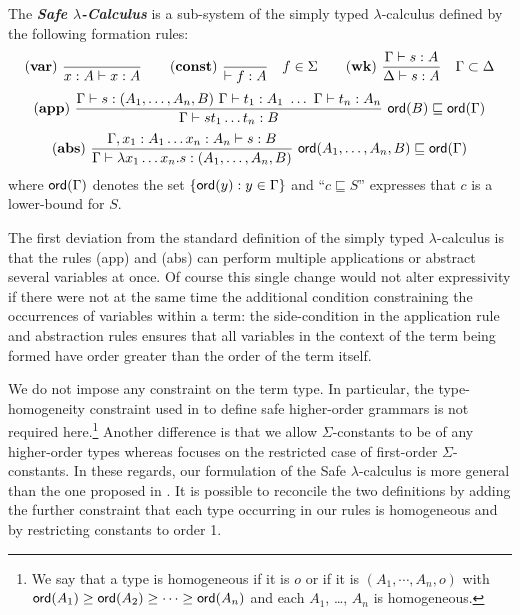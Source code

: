 \documentclass{llncs}
\newcommand\defname[1]{{\bf\em #1}\index{#1}}
\newcommand\dps{\displaystyle}
\newcommand\rulef[2]{\frac{\dps #1}{#2}}
\newcommand\ord[1]{{\sf ord}(#1)}
\newcommand{\rulename}[1]{\mathbf{(#1)}}
\begin{document}
\begin{definition}
The \defname{Safe $\lambda$-Calculus} is a sub-system of the simply typed $\lambda$-calculus
defined by the following formation rules:
$$ \rulename{var} \   \rulef{}{x : A\vdash x : A}
\qquad  \rulename{const} \   \rulef{}{\vdash f : A} \quad f \in \Sigma
\qquad  \rulename{wk} \   \rulef{\Gamma \vdash s : A}{\Delta \vdash s : A} \quad \Gamma \subset \Delta$$
$$ \rulename{app} \  \rulef{\Gamma \vdash s : (A_1,\ldots,A_n,B)
                                        \ \Gamma \vdash t_1 : A_1
                                        \  \ldots\  \Gamma \vdash t_n : A_n }
                                   {\Gamma  \vdash s t_1 \ldots t_n : B}
                                    \
                                   \ord{B} \sqsubseteq \ord{\Gamma}$$
$$ \rulename{abs} \   \rulef{\Gamma, x_1 : A_1 \ldots x_n : A_n \vdash s : B}
                                   {\Gamma  \vdash \lambda x_1 \ldots x_n . s : (A_1, \ldots ,A_n,B)} \
                                   \ord{A_1, \ldots ,A_n,B} \sqsubseteq \ord{\Gamma}$$
where $\ord{\Gamma}$ denotes the set $\{ \ord{y} : y \in \Gamma \}$ and ``$c \sqsubseteq S$'' expresses that
$c$ is a lower-bound for $S$.
\end{definition}

The first deviation from the standard definition of the simply typed $\lambda$-calculus is that the rules {\sf (app)} and {\sf (abs)}
can perform multiple applications or abstract several variables at once.
Of course this single change would not alter expressivity if there were not at the same time the additional condition
constraining the occurrences of variables within a term:  the side-condition in the application rule and abstraction rules ensures that all variables in the context of the term being formed have order greater than the order of the term itself.


We do not impose any constraint on the term type. In particular, the type-homogeneity constraint used
in \cite{KNU02} to define safe higher-order grammars is not required here.\footnote{ We say that a type is homogeneous
if it is $o$ or if it is $(A_1, \cdots, A_n, o)$ with $\ord{A_1} \geq \ord{A_2}\geq \cdots \geq \ord{A_n}$ and
each $A_1$, \ldots, $A_n$ is homogeneous.} Another difference is that we allow $\Sigma$-constants to be of any higher-order types whereas
\cite{KNU02} focuses on the restricted case of first-order $\Sigma$-constants.
In these regards, our formulation of the Safe $\lambda$-calculus is more general than the one proposed in \cite{safety-mirlong2004}.
It is possible to reconcile the two definitions by adding the further constraint that each type occurring in our rules is homogeneous
and by restricting constants to order 1.
\end{document}

